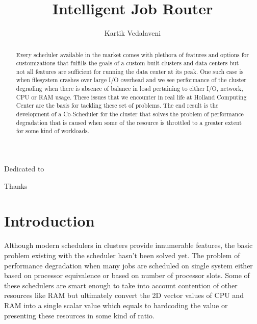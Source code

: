 \documentclass[ms,electronic,double]{nuthesis}
\begin{document}
  
\frontmatter
\title{Intelligent Job Router}
\author{Kartik Vedalaveni}

\maketitle

\begin{abstract}

Every scheduler available in the market comes with plethora of features and 
options for customizations that fulfills the goals of a custom built 
clusters and data centers but not all features are sufficient for running the 
data center at its peak. One such case is when filesystem crashes over large I/O 
overhead and we see performance of the cluster degrading when there is absence of balance in load
pertaining to either I/O, network, CPU or RAM usage.
These issues that we encounter in real life at Holland Computing Center are the 
basis for tackling these set of problems. The end result is the development of a Co-Scheduler for the
cluster that solves the problem of performance degradation that is caused when some of the resource 
is throttled to a greater extent for some kind of workloads.

\end{abstract}

\begin{dedication}
Dedicated to 
\end{dedication}

\begin{acknowledgments}
Thanks
\end{acknowledgments}

\tableofcontents


\mainmatter

\chapter{Introduction}
Although modern schedulers in clusters provide innumerable features, the basic 
problem existing with the scheduler hasn't been solved yet. The problem of 
performance degradation when many jobs are scheduled on single system either 
based on processor equivalence or based on number of processor slots. Some of 
these schedulers are smart enough to take into account contention of other 
resources like RAM but ultimately convert the 2D vector values of CPU and RAM 
into a single scalar value which equals to hardcoding the value or presenting these resources
in some kind of ratio.
\end{document}
